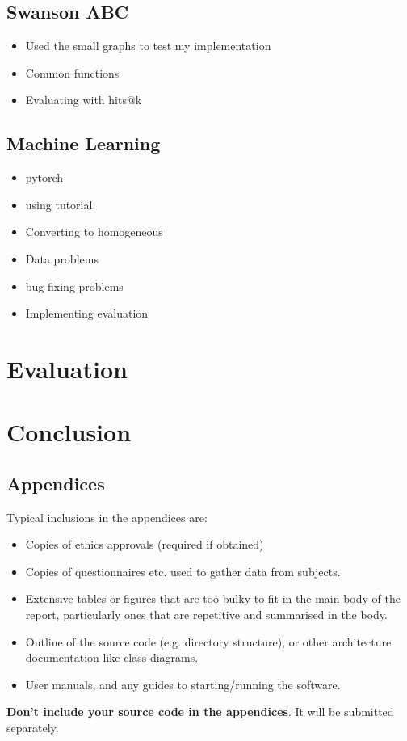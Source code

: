 \documentclass{l4proj}
\begin{document}
\section{Swanson ABC}
\begin{itemize}
    \item Used the small graphs to test my implementation
    \item Common functions
    \item Evaluating with hits@k
\end{itemize}
\section{Machine Learning}
\begin{itemize}
    \item pytorch
    \item using tutorial
    \item Converting to homogeneous
    \item Data problems
    \item bug fixing problems
    \item Implementing evaluation
\end{itemize}

\chapter{Evaluation} 

\chapter{Conclusion}    

\begin{appendices}

\chapter{Appendices}

Typical inclusions in the appendices are:

\begin{itemize}
\item
  Copies of ethics approvals (required if obtained)
\item
  Copies of questionnaires etc. used to gather data from subjects.
\item
  Extensive tables or figures that are too bulky to fit in the main body of
  the report, particularly ones that are repetitive and summarised in the body.

\item Outline of the source code (e.g. directory structure), or other architecture documentation like class diagrams.

\item User manuals, and any guides to starting/running the software.

\end{itemize}

\textbf{Don't include your source code in the appendices}. It will be
submitted separately.

\end{appendices}
\end{document}

